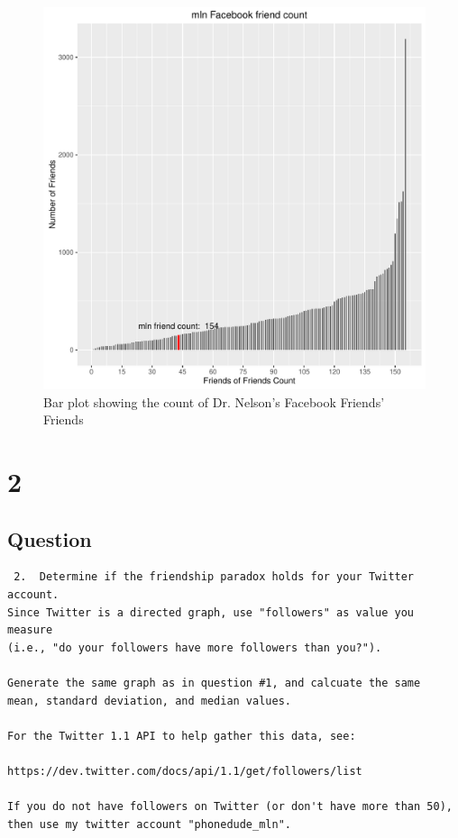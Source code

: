 \documentclass[letterpaper,10pt]{article}
\begin{document}
\newpage
\begin{figure}[h]
\includegraphics[scale=0.7]{mlnFacebookParadox.pdf}
\caption{Bar plot showing the count of Dr. Nelson's Facebook Friends' Friends}
\label{fig:fbp}
\end{figure}
\newpage
 
 \newpage
\section*{2}
\subsection*{Question}
\begin{verbatim}
 2.  Determine if the friendship paradox holds for your Twitter account.
Since Twitter is a directed graph, use "followers" as value you measure
(i.e., "do your followers have more followers than you?").

Generate the same graph as in question #1, and calcuate the same 
mean, standard deviation, and median values.

For the Twitter 1.1 API to help gather this data, see:

https://dev.twitter.com/docs/api/1.1/get/followers/list

If you do not have followers on Twitter (or don't have more than 50),
then use my twitter account "phonedude_mln".
\end{verbatim}
\end{document}
